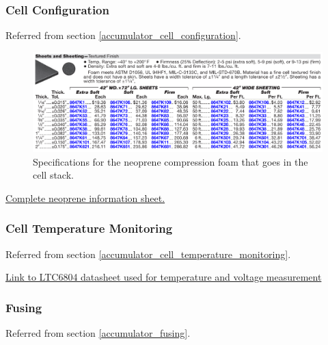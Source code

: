 \documentclass{article}
\begin{document}
\subsubsection{Cell Configuration}\label{appendix_accumulator_cell_configuration}
Referred from section \ref{accumulator_cell_configuration}.

\begin{figure} [H]
	\centering  %
	\includegraphics[width=\textwidth]{Cell_neoprene_stats.png}
	\caption{Specifications for the neoprene compression foam that goes in the cell stack.}	
	\label{fig:cell_neoprene_stats}
\end{figure}
\href{http://www.kvc.com.my/StorageAttachment/Kvcsb/datasheet/898/mcmaster-8694K154.pdf}{Complete neoprene information sheet.}

\subsubsection{Cell Temperature Monitoring}\label{appendix_accumulator_temperature}
Referred from section \ref{accumulator_cell_temperature_monitoring}.

\href{http://cds.linear.com/docs/en/datasheet/680412fc.pdf}{Link to LTC6804 datasheet used for temperature and voltage measurement}

\setcounter{subsubsection}{8}
\subsubsection{Fusing}\label{appendix_accumulator_fusing}
Referred from section \ref{accumulator_fusing}. 
\end{document}
